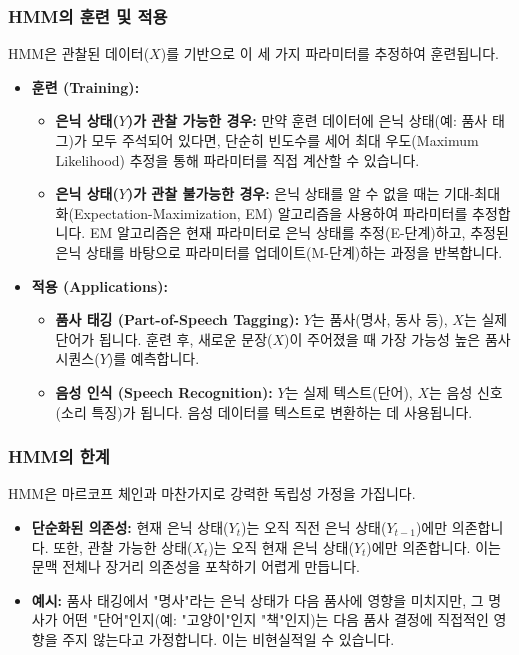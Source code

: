 \documentclass[11pt,a4paper]{article}
\theoremstyle{definition}
\begin{document}
\subsubsection{HMM의 훈련 및 적용}
HMM은 관찰된 데이터($X$)를 기반으로 이 세 가지 파라미터를 추정하여 훈련됩니다.

\begin{itemize}
    \item \textbf{훈련 (Training):}
    \begin{itemize}
        \item \textbf{은닉 상태($Y$)가 관찰 가능한 경우:} 만약 훈련 데이터에 은닉 상태(예: 품사 태그)가 모두 주석되어 있다면, 단순히 빈도수를 세어 최대 우도(Maximum Likelihood) 추정을 통해 파라미터를 직접 계산할 수 있습니다.
        \item \textbf{은닉 상태($Y$)가 관찰 불가능한 경우:} 은닉 상태를 알 수 없을 때는 기대-최대화(Expectation-Maximization, EM) 알고리즘을 사용하여 파라미터를 추정합니다. EM 알고리즘은 현재 파라미터로 은닉 상태를 추정(E-단계)하고, 추정된 은닉 상태를 바탕으로 파라미터를 업데이트(M-단계)하는 과정을 반복합니다.
    \end{itemize}
    \item \textbf{적용 (Applications):}
    \begin{itemize}
        \item \textbf{품사 태깅 (Part-of-Speech Tagging):} $Y$는 품사(명사, 동사 등), $X$는 실제 단어가 됩니다. 훈련 후, 새로운 문장($X$)이 주어졌을 때 가장 가능성 높은 품사 시퀀스($Y$)를 예측합니다.
        \item \textbf{음성 인식 (Speech Recognition):} $Y$는 실제 텍스트(단어), $X$는 음성 신호(소리 특징)가 됩니다. 음성 데이터를 텍스트로 변환하는 데 사용됩니다.
    \end{itemize}
\end{itemize}

\subsubsection{HMM의 한계}
HMM은 마르코프 체인과 마찬가지로 강력한 독립성 가정을 가집니다.
\begin{itemize}
    \item \textbf{단순화된 의존성:} 현재 은닉 상태($Y_t$)는 오직 직전 은닉 상태($Y_{t-1}$)에만 의존합니다. 또한, 관찰 가능한 상태($X_t$)는 오직 현재 은닉 상태($Y_t$)에만 의존합니다. 이는 문맥 전체나 장거리 의존성을 포착하기 어렵게 만듭니다.
    \item \textbf{예시:} 품사 태깅에서 "명사"라는 은닉 상태가 다음 품사에 영향을 미치지만, 그 명사가 어떤 "단어"인지(예: "고양이"인지 "책"인지)는 다음 품사 결정에 직접적인 영향을 주지 않는다고 가정합니다. 이는 비현실적일 수 있습니다.
\end{itemize}
\end{document}
